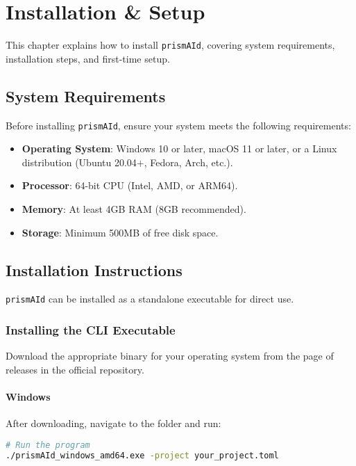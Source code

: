 \chapter{Installation \& Setup} 
\label{chap:install}

This chapter explains how to install \texttt{prismAId}, covering system requirements, installation steps, and first-time setup.

\section{System Requirements}

Before installing \texttt{prismAId}, ensure your system meets the following requirements:

\begin{itemize}
    \item \textbf{Operating System}: Windows 10 or later, macOS 11 or later, or a Linux distribution (Ubuntu 20.04+, Fedora, Arch, etc.).
    \item \textbf{Processor}: 64-bit CPU (Intel, AMD, or ARM64).
    \item \textbf{Memory}: At least 4GB RAM (8GB recommended).
    \item \textbf{Storage}: Minimum 500MB of free disk space.
\end{itemize}

\section{Installation Instructions}

\texttt{prismAId} can be installed as a standalone executable for direct use.

\subsection{Installing the CLI Executable}

Download the appropriate binary for your operating system from the page of releases in the official repository.

\subsubsection{Windows}
\begin{commandbox}
After downloading, navigate to the folder and run:
\begin{lstlisting}[language=Bash]
# Run the program
./prismAId_windows_amd64.exe -project your_project.toml
\end{lstlisting}
\end{commandbox}


